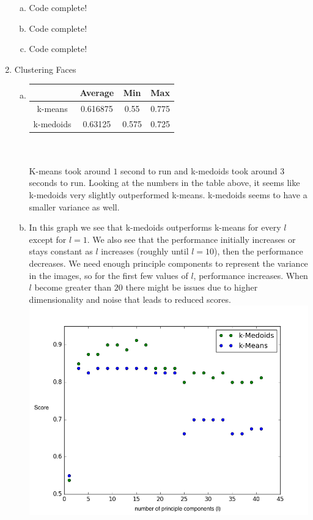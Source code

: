 \documentclass[11pt]{article}
\begin{document}
\begin{enumerate}[1]
\begin{enumerate}[(a)]
\item Code complete!
\item Code complete!
\item Code complete!
\end{enumerate}
\item Clustering Faces
\begin{enumerate}[(a)]
\item \begin{tabular}{| c | c | c | c |}
  \hline		
   & Average & Min & Max \\
  \hline
  k-means & 0.616875 & 0.55 & 0.775 \\
  k-medoids & 0.63125 & 0.575 & 0.725   \\
  \hline
\end{tabular}\\ \\
K-means took around $1$ second to run and k-medoids took around $3$ seconds to run. Looking at the numbers in the table above, it seems like k-medoids very slightly outperformed k-means. k-medoids seems to have a smaller variance as well. 
\item In this graph we see that k-medoids outperforms k-means for every $l$ except for $l=1$. We also see that the performance initially increases or stays constant as $l$ increases (roughly until $l=10$), then the performance decreases. We need enough principle components to represent the variance in the images, so for the first few values of $l$, performance increases. When $l$ become greater than $20$ there might be issues due to higher dimensionality and noise that leads to reduced scores.  \\
\includegraphics[scale=0.7]{figure_1}

\end{enumerate}
\end{enumerate}
\end{document}

